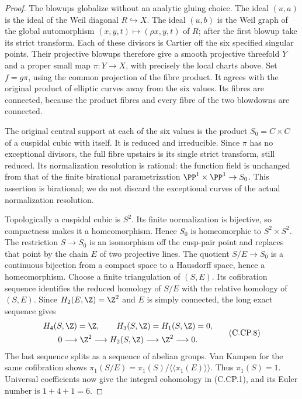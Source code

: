 \begin{proof}
The blowups globalize without an analytic gluing choice.
The ideal $(u,a)$ is the ideal of the Weil diagonal
$R\hookrightarrow X$. The ideal $(u,b)$ is the Weil
graph of the global automorphism
$(x,y,t)\mapsto(\rho x,y,t)$ of $R$; after the first
blowup take its strict transform. Each of these divisors
is Cartier off the six specified singular points.
Their projective blowups therefore give a smooth
projective threefold $Y$ and a proper small map
$\pi:Y\to X$, with precisely the local charts above.
Set $f=g\pi$, using the common projection of the fibre
product. It agrees with the original product of elliptic
curves away from the six values. Its fibres are connected,
because the product fibres and every fibre of the two
blowdowns are connected.

The original central support at each of the six values
is the product $S_0=C\times C$ of a cuspidal cubic with
itself. It is reduced and irreducible. Since $\pi$ has
no exceptional divisors, the full fibre upstairs is its
single strict transform, still reduced. Its normalization
resolution is rational: the function field is unchanged
from that of the finite birational parametrization
$\PP^1\times\PP^1\to S_0$. This assertion is birational;
we do not discard the exceptional curves of the actual
normalization resolution.

Topologically a cuspidal cubic is $S^2$. Its finite
normalization is bijective, so compactness makes it a
homeomorphism. Hence $S_0$ is homeomorphic to
$S^2\times S^2$. The restriction $S\to S_0$ is an
isomorphism off the cusp-pair point and replaces that
point by the chain $E$ of two projective lines. The
quotient $S/E\to S_0$ is a continuous bijection from a
compact space to a Hausdorff space, hence a homeomorphism.
Choose a finite triangulation of $(S,E)$. Its cofibration
sequence identifies the reduced homology of $S/E$ with
the relative homology of $(S,E)$. Since
$H_2(E,\Z)=\Z^2$ and $E$ is simply connected, the
long exact sequence gives
\[
 \begin{gathered}
 H_4(S,\Z)=\Z,\qquad H_3(S,\Z)=H_1(S,\Z)=0,\\
 0\longrightarrow\Z^2\longrightarrow H_2(S,\Z)
                 \longrightarrow\Z^2\longrightarrow0.
 \end{gathered}                                  \tag{C.CP.8}
\]
The last sequence splits as a sequence of abelian groups.
Van Kampen for the same cofibration shows
$\pi_1(S/E)=\pi_1(S)/\langle\!\langle\pi_1(E)\rangle\!\rangle$.
Thus $\pi_1(S)=1$. Universal coefficients now give the
integral cohomology in (C.CP.1), and its Euler number
is $1+4+1=6$.


\end{proof}
